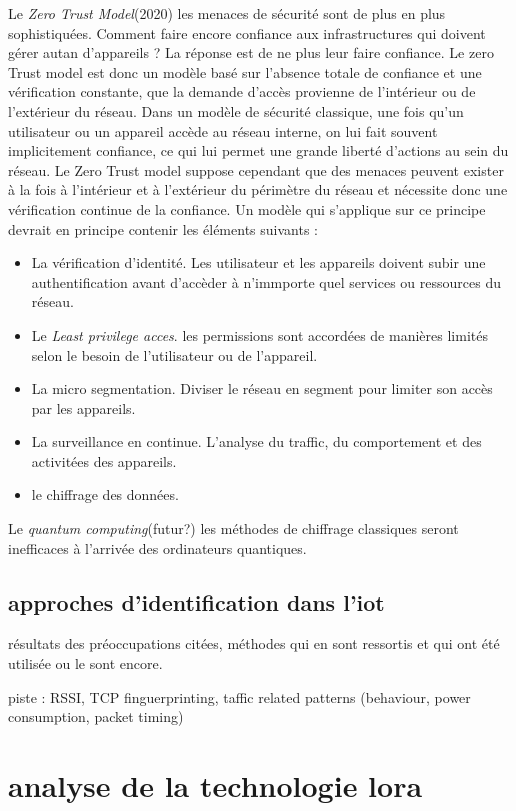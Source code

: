 Le \textit{Zero Trust Model}(2020) 
les menaces de sécurité sont de plus en plus sophistiquées. Comment faire encore confiance aux infrastructures qui doivent gérer autan d'appareils ? La réponse est de ne plus leur faire confiance. Le zero Trust model est donc un modèle basé sur l'absence totale de confiance et une vérification constante, que la demande d'accès provienne de l'intérieur ou de l'extérieur du réseau. Dans un modèle de sécurité classique, une fois qu'un utilisateur ou un appareil accède au réseau interne, on lui fait souvent implicitement confiance, ce qui lui permet une grande liberté d'actions au sein du réseau. Le Zero Trust model suppose cependant que des menaces peuvent exister à la fois à l’intérieur et à l’extérieur du périmètre du réseau et nécessite donc une vérification continue de la confiance. Un modèle qui s'applique sur ce principe devrait en principe contenir les éléments suivants :
\begin{itemize}
\item La vérification d'identité. Les utilisateur et les appareils doivent subir une authentification avant d'accèder à n'immporte quel services ou ressources du réseau.
\item Le \textit{Least privilege acces}. les permissions sont accordées de manières limités selon le besoin de l'utilisateur ou de l'appareil.
\item La micro segmentation. Diviser le réseau en segment pour limiter son accès par les appareils.
\item La surveillance en continue. L'analyse du traffic, du comportement et des activitées des appareils.
\item le chiffrage des données.
\end{itemize}

Le \textit{quantum computing}(futur?)
les méthodes de chiffrage classiques seront inefficaces à l'arrivée des ordinateurs quantiques.

\subsection{approches d'identification dans l'iot}

résultats des préoccupations citées, méthodes qui en sont ressortis et qui ont été utilisée ou le sont encore.

piste : RSSI, TCP finguerprinting, taffic related patterns (behaviour, power consumption, packet timing) 

\section{analyse de la technologie lora}

